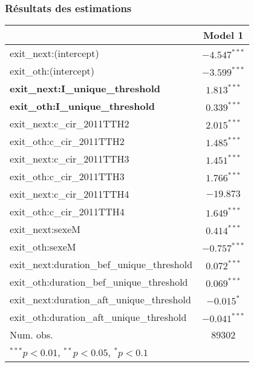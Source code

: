 \documentclass[xcolor=table,ignorenonframetext,12pt]{beamer}
\begin{document}
\begin{frame}
\frametitle{Résultats des estimations}

\begin{table}[!ht]
\begin{center}
\scriptsize
\begin{tabular}{l c }
\toprule
 & Model 1 \\
\midrule
exit\_next:(intercept)                      & $-4.547^{***}$ \\
exit\_oth:(intercept)                       & $-3.599^{***}$ \\
\textbf{exit\_next:I\_unique\_threshold  }           & $\mathbf{1.813^{***}}$ \\
\textbf{exit\_oth:I\_unique\_threshold  }            & \textbf{$\mathbf{0.339^{***}}$}  \\
exit\_next:c\_cir\_2011TTH2                 & $2.015^{***}$  \\

exit\_oth:c\_cir\_2011TTH2                  & $1.485^{***}$  \\
 
exit\_next:c\_cir\_2011TTH3                 & $1.451^{***}$  \\
  
exit\_oth:c\_cir\_2011TTH3                  & $1.766^{***}$  \\
exit\_next:c\_cir\_2011TTH4                 & $-19.873$      \\
    
exit\_oth:c\_cir\_2011TTH4                  & $1.649^{***}$  \\
                                        
exit\_next:sexeM                            & $0.414^{***}$  \\
exit\_oth:sexeM                             & $-0.757^{***}$ \\
exit\_next:duration\_bef\_unique\_threshold & $0.072^{***}$  \\
exit\_oth:duration\_bef\_unique\_threshold  & $0.069^{***}$  \\
exit\_next:duration\_aft\_unique\_threshold & $-0.015^{*}$   \\
exit\_oth:duration\_aft\_unique\_threshold  & $-0.041^{***}$ \\
\midrule
Num. obs.                                   & 89302          \\
\bottomrule
\multicolumn{2}{l}{\scriptsize{$^{***}p<0.01$, $^{**}p<0.05$, $^*p<0.1$}}
\end{tabular}
\label{table:coefficients}
\end{center}
\end{table}


\end{frame}
\end{document}
